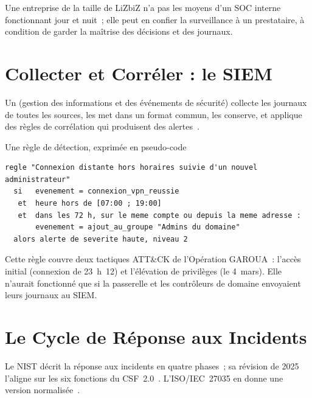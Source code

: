 Une entreprise de la taille de LiZbiZ n'a pas les moyens d'un SOC interne
fonctionnant jour et nuit~; elle peut en confier la surveillance à un
prestataire, à condition de garder la maîtrise des décisions et des
journaux.

\section{Collecter et Corréler : le SIEM}
\label{sec:c22-siem}

Un  (gestion des informations et des événements de
sécurité) collecte les journaux de toutes les sources, les met dans un
format commun, les conserve, et applique des règles de corrélation qui
produisent des alertes~\cite{nist80092}.

\begin{boxoutils}{Une règle de détection, exprimée en pseudo-code}
\begin{lstlisting}
regle "Connexion distante hors horaires suivie d'un nouvel administrateur"
  si   evenement = connexion_vpn_reussie
   et  heure hors de [07:00 ; 19:00]
   et  dans les 72 h, sur le meme compte ou depuis la meme adresse :
       evenement = ajout_au_groupe "Admins du domaine"
  alors alerte de severite haute, niveau 2
\end{lstlisting}
Cette règle couvre deux tactiques ATT\&CK de l'Opération GAROUA~: l'accès
initial (connexion de 23~h~12) et l'élévation de privilèges (le 4~mars).
Elle n'aurait fonctionné que si la passerelle et les contrôleurs de domaine
envoyaient leurs journaux au SIEM.
\end{boxoutils}

\section{Le Cycle de Réponse aux Incidents}
\label{sec:c22-cycle}

Le NIST décrit la réponse aux incidents en quatre phases~; sa révision de
2025 l'aligne sur les six fonctions du CSF~2.0~\cite{nist80061r2,nist80061r3}.
L'ISO/IEC~27035 en donne une version normalisée~\cite{iso27035_2023}.

